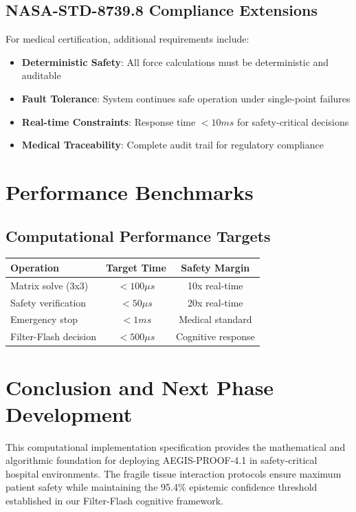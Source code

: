 \documentclass[11pt]{article}
\begin{document}
\subsection{NASA-STD-8739.8 Compliance Extensions}

For medical certification, additional requirements include:

\begin{itemize}
\item \textbf{Deterministic Safety}: All force calculations must be deterministic and auditable
\item \textbf{Fault Tolerance}: System continues safe operation under single-point failures
\item \textbf{Real-time Constraints}: Response time $< 10ms$ for safety-critical decisions
\item \textbf{Medical Traceability}: Complete audit trail for regulatory compliance
\end{itemize}

\section{Performance Benchmarks}

\subsection{Computational Performance Targets}

\begin{center}
\begin{tabular}{|l|c|c|}
\hline
\textbf{Operation} & \textbf{Target Time} & \textbf{Safety Margin} \\
\hline
Matrix solve (3x3) & $< 100\mu s$ & 10x real-time \\
Safety verification & $< 50\mu s$ & 20x real-time \\
Emergency stop & $< 1ms$ & Medical standard \\
Filter-Flash decision & $< 500\mu s$ & Cognitive response \\
\hline
\end{tabular}
\end{center}

\section{Conclusion and Next Phase Development}

This computational implementation specification provides the mathematical and algorithmic foundation for deploying AEGIS-PROOF-4.1 in safety-critical hospital environments. The fragile tissue interaction protocols ensure maximum patient safety while maintaining the 95.4\% epistemic confidence threshold established in our Filter-Flash cognitive framework.
\end{document}
